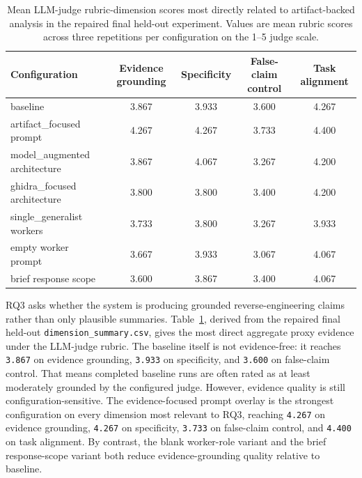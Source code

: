 \begin{table}[t]
\centering
\scriptsize
\caption{Mean LLM-judge rubric-dimension scores most directly related to artifact-backed analysis in the repaired final held-out experiment. Values are mean rubric scores across three repetitions per configuration on the 1--5 judge scale.}
\label{tab:final-evidence-dimensions}
\begin{tabular}{|p{1.95in}|c|c|c|c|}
\hline
Configuration & Evidence grounding & Specificity & False-claim control & Task alignment \\
\hline
baseline & 3.867 & 3.933 & 3.600 & 4.267 \\
artifact\_focused prompt & 4.267 & 4.267 & 3.733 & 4.400 \\
model\_augmented architecture & 3.867 & 4.067 & 3.267 & 4.200 \\
ghidra\_focused architecture & 3.800 & 3.800 & 3.400 & 4.200 \\
single\_generalist workers & 3.733 & 3.800 & 3.267 & 3.933 \\
empty worker prompt & 3.667 & 3.933 & 3.067 & 4.067 \\
brief response scope & 3.600 & 3.867 & 3.400 & 4.067 \\
\hline
\end{tabular}
\end{table}

RQ3 asks whether the system is producing grounded reverse-engineering claims rather than only plausible summaries. Table~\ref{tab:final-evidence-dimensions}, derived from the repaired final held-out \texttt{dimension\_summary.csv}, gives the most direct aggregate proxy evidence under the LLM-judge rubric. The baseline itself is not evidence-free: it reaches \texttt{3.867} on evidence grounding, \texttt{3.933} on specificity, and \texttt{3.600} on false-claim control. That means completed baseline runs are often rated as at least moderately grounded by the configured judge. However, evidence quality is still configuration-sensitive. The evidence-focused prompt overlay is the strongest configuration on every dimension most relevant to RQ3, reaching \texttt{4.267} on evidence grounding, \texttt{4.267} on specificity, \texttt{3.733} on false-claim control, and \texttt{4.400} on task alignment. By contrast, the blank worker-role variant and the brief response-scope variant both reduce evidence-grounding quality relative to baseline.

